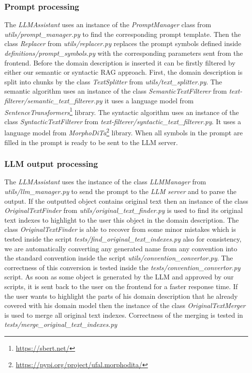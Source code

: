 \subsubsection{Prompt processing}

The \textit{LLMAssistant} uses an instance of the \textit{PromptManager} class from \textit{utils/prompt\_manager.py} to find the corresponding prompt template.
Then the class \textit{Replacer} from \textit{utils/replacer.py} replaces the prompt symbols defined inside \textit{definitions/prompt\_symbols.py} with the corresponding parameters sent from the frontend. Before the domain description is inserted it can be firstly filtered by either our semantic or syntactic RAG approach. First, the domain description is split into chunks by the class \textit{TextSplitter} from \textit{utils/text\_splitter.py}. The semantic algorithm uses an instance of the class \textit{SemanticTextFilterer} from \textit{text-filterer/semantic\_text\_filterer.py} it uses a language model from \textit{SentenceTransformers}\footnote{\url{https://sbert.net/}} library. The syntactic algorithm uses an instance of the class \textit{SyntacticTextFilterer} from \textit{text-filterer/syntactic\_text\_filterer.py}. It uses a language model from \textit{MorphoDiTa}\footnote{\url{https://pypi.org/project/ufal.morphodita/}} library. When all symbols in the prompt are filled in the prompt is ready to be sent to the LLM server.


\subsubsection{LLM output processing}

The \textit{LLMAssistant} uses the instance of the class \textit{LLMManager} from \textit{utils/llm\_manager.py} to send the prompt to the \emph{LLM server} and to parse the output. If the outputted object contains original text then an instance of the class \textit{OriginalTextFinder} from \textit{utils/original\_text\_finder.py} is used to find its original text indexes to highlight to the user this object in the domain description. The class \textit{OriginalTextFinder} is able to recover from some minor mistakes which is tested inside the script \textit{tests/find\_original\_text\_indexes.py}
also for consistency, we are automatically converting any generated name from any convention into the standard convention inside the script \textit{utils/convention\_convertor.py}. The correctness of this conversion is tested inside the \textit{tests/convention\_convertor.py} script. As soon as some object is generated by the LLM and approved by our scripts, it is sent back to the user on the frontend for a faster response time. If the user wants to highlight the parts of his domain description that he already covered with his domain model then the instance of the class \textit{OriginalTextMerger} is used to merge all original text indexes. Correctness of the merging is tested in \textit{tests/merge\_original\_text\_indexes.py}